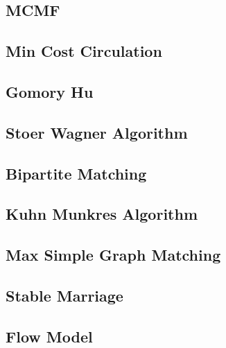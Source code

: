 \documentclass{article}
\begin{document}
\subsection{MCMF}


\subsection{Min Cost Circulation}


\subsection{Gomory Hu}


%

\subsection{Stoer Wagner Algorithm}


\subsection{Bipartite Matching}


\subsection{Kuhn Munkres Algorithm}


\subsection{Max Simple Graph Matching}


\subsection{Stable Marriage}


\subsection{Flow Model}

\end{document}
